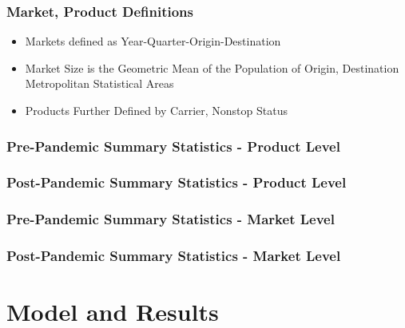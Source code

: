\documentclass[xcolor=dvipsnames]{beamer}
\begin{document}
    \begin{frame}
        \frametitle{Market, Product Definitions}
        \begin{itemize}
        	\item Markets defined as Year-Quarter-Origin-Destination 
			\item Market Size is the Geometric Mean of the Population of Origin, Destination Metropolitan Statistical Areas
			\item Products Further Defined by Carrier, Nonstop Status
        \end{itemize}
    \end{frame}

      \begin{frame}
        \frametitle{Pre-Pandemic Summary Statistics - Product Level}
            \resizebox{0.8\linewidth}{!}{%

}
    \end{frame}

    \begin{frame}
        \frametitle{Post-Pandemic Summary Statistics - Product Level}
                \resizebox{0.8\linewidth}{!}{%

}
    \end{frame}

    \begin{frame}
        \frametitle{Pre-Pandemic Summary Statistics - Market Level}
        \centering
        \begin{adjustbox}{max height=\dimexpr\textheight-5.5cm\relax,
           max width=\textwidth}

\end{adjustbox}
    \end{frame}

     \begin{frame}
        \frametitle{Post-Pandemic Summary Statistics - Market Level}
        \centering
        \begin{adjustbox}{max height=\dimexpr\textheight-5.5cm\relax,
           max width=\textwidth}

\end{adjustbox}
    \end{frame}

    \section{Model and Results}
\end{document}
